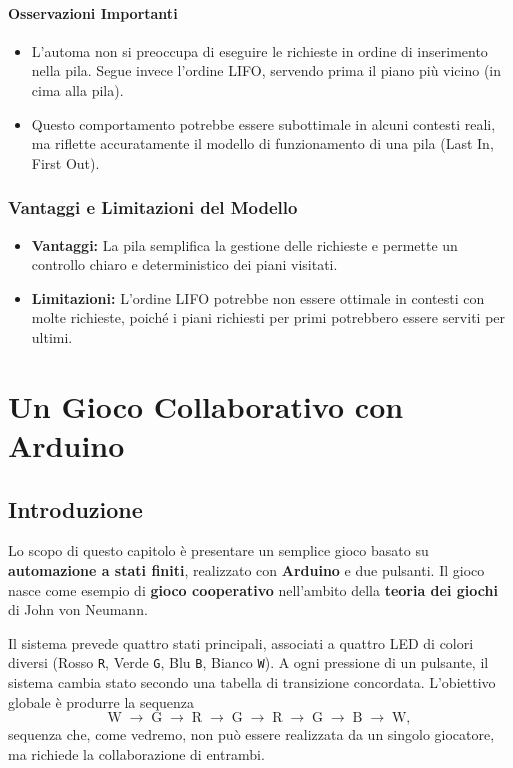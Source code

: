 \documentclass[a4paper,12pt]{report}
\begin{document}
\subsubsection*{Osservazioni Importanti}
\begin{itemize}
    \item L'automa non si preoccupa di eseguire le richieste in ordine di inserimento nella pila. Segue invece l'ordine LIFO, servendo prima il piano più vicino (in cima alla pila).
    \item Questo comportamento potrebbe essere subottimale in alcuni contesti reali, ma riflette accuratamente il modello di funzionamento di una pila (Last In, First Out).
\end{itemize}

\subsection*{Vantaggi e Limitazioni del Modello}
\begin{itemize}
    \item \textbf{Vantaggi:} La pila semplifica la gestione delle richieste e permette un controllo chiaro e deterministico dei piani visitati.
    \item \textbf{Limitazioni:} L'ordine LIFO potrebbe non essere ottimale in contesti con molte richieste, poiché i piani richiesti per primi potrebbero essere serviti per ultimi.
\end{itemize}

\chapter{Un Gioco Collaborativo con Arduino}
\label{cap:gioco}

\section{Introduzione}
Lo scopo di questo capitolo è presentare un semplice gioco basato su \textbf{automazione a stati finiti}, realizzato con \textbf{Arduino} e due pulsanti. Il gioco nasce come esempio di \textbf{gioco cooperativo} nell'ambito della \textbf{teoria dei giochi} di John von Neumann.

Il sistema prevede quattro stati principali, associati a quattro LED di colori diversi (Rosso \texttt{R}, Verde \texttt{G}, Blu \texttt{B}, Bianco \texttt{W}). A ogni pressione di un pulsante, il sistema cambia stato secondo una tabella di transizione concordata. L’obiettivo globale è produrre la sequenza 
\[
\text{W} \;\to\; \text{G} \;\to\; \text{R} \;\to\; \text{G} \;\to\; \text{R} \;\to\; \text{G} \;\to\; \text{B} \;\to\; \text{W},
\]
sequenza che, come vedremo, non può essere realizzata da un singolo giocatore, ma richiede la collaborazione di entrambi.
\end{document}
